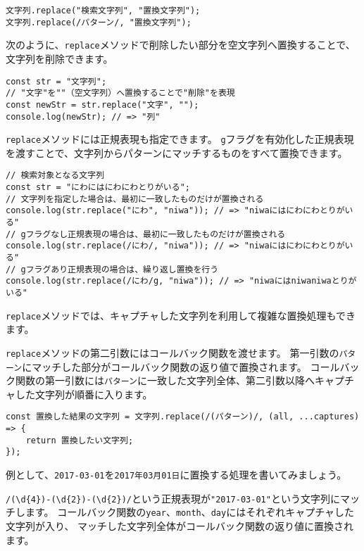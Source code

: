 \begin{lstlisting}
文字列.replace("検索文字列", "置換文字列");
文字列.replace(/パターン/, "置換文字列");
\end{lstlisting}

次のように、\texttt{replace}メソッドで削除したい部分を空文字列へ置換することで、文字列を削除できます。

\begin{lstlisting}
const str = "文字列";
// "文字"を""（空文字列）へ置換することで"削除"を表現
const newStr = str.replace("文字", "");
console.log(newStr); // => "列"
\end{lstlisting}

\texttt{replace}メソッドには正規表現も指定できます。
\texttt{g}フラグを有効化した正規表現を渡すことで、文字列からパターンにマッチするものをすべて置換できます。

\begin{lstlisting}
// 検索対象となる文字列
const str = "にわにはにわにわとりがいる";
// 文字列を指定した場合は、最初に一致したものだけが置換される
console.log(str.replace("にわ", "niwa")); // => "niwaにはにわにわとりがいる"
// gフラグなし正規表現の場合は、最初に一致したものだけが置換される
console.log(str.replace(/にわ/, "niwa")); // => "niwaにはにわにわとりがいる"
// gフラグあり正規表現の場合は、繰り返し置換を行う
console.log(str.replace(/にわ/g, "niwa")); // => "niwaにはniwaniwaとりがいる"
\end{lstlisting}

\texttt{replace}メソッドでは、キャプチャした文字列を利用して複雑な置換処理もできます。

\texttt{replace}メソッドの第二引数にはコールバック関数を渡せます。
第一引数の\texttt{パターン}にマッチした部分がコールバック関数の返り値で置換されます。
コールバック関数の第一引数には\texttt{パターン}に一致した文字列全体、第二引数以降へキャプチャした文字列が順番に入ります。

\begin{lstlisting}
const 置換した結果の文字列 = 文字列.replace(/(パターン)/, (all, ...captures) => {
    return 置換したい文字列;
});
\end{lstlisting}

例として、\texttt{2017-03-01}を\texttt{2017年03月01日}に置換する処理を書いてみましょう。

\texttt{/(\textbackslash d\{4\})-(\textbackslash d\{2\})-(\textbackslash d\{2\})/}という正規表現が\texttt{"2017-03-01"}という文字列にマッチします。
コールバック関数の\texttt{year}、\texttt{month}、\texttt{day}にはそれぞれキャプチャした文字列が入り、
マッチした文字列全体がコールバック関数の返り値に置換されます。

